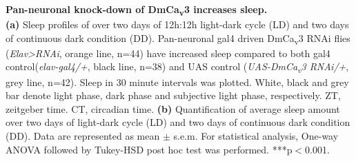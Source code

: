 \label{fig:5}
\textbf{Pan-neuronal knock-down of DmCa\textsubscript{v}3 increases sleep.}
\\
\textbf{(a)} Sleep profiles of over two days of 12h:12h light-dark cycle (LD) and two days of continuous dark condition (DD). Pan-neuronal gal4 driven DmCa\textsubscript{v}3 RNAi flies (\emph{Elav\textgreater{}RNAi}, orange line, n=44) have increased sleep compared to both gal4 control(\emph{elav-gal4/+}, black line, n=38) and UAS control (\emph{UAS-DmCa\textsubscript{v}3 RNAi/+}, grey line, n=42). 
Sleep in 30 minute intervals was plotted.
White, black and grey bar denote light phase, dark phase and subjective light phase, respectively.
ZT, zeitgeber time.
CT, circadian time.
\textbf{(b)} Quantification of average sleep amount over two days of light-dark cycle (LD) and two days of continuous dark condition (DD).
Data are represented as mean $\pm$ s.e.m.
For statistical analysis, One-way ANOVA followed by Tukey-HSD post hoc test was performed.
***p$<$0.001.
  
  
  
  
  
  
  
  
  
  
  
  